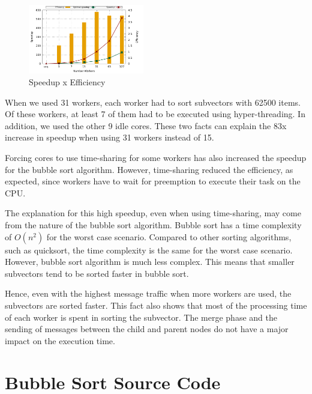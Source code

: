 \documentclass[10pt,twocolumn]{article}
\begin{document}
\begin{figure}[ht]
	\centering
	\includegraphics[width=0.45\textwidth]{../logs/scripts/bubble-sort-speedup-efficiency.pdf}
	\caption{Speedup x Efficiency}
	\label{fig:bubble-sort-speedup-efficiency}
\end{figure}

When we used 31 workers, each worker had to sort subvectors with 62500 items. Of these workers, at least 7 of them had to be executed using hyper-threading. In addition, we used the other 9 idle cores. These two facts can explain the 83x increase in speedup when using 31 workers instead of 15.

Forcing cores to use time-sharing for some workers has also increased the speedup for the bubble sort algorithm. However, time-sharing reduced the efficiency, as expected, since workers have to wait for preemption to execute their task on the CPU.

The explanation for this high speedup, even when using time-sharing, may come from the nature of the bubble sort algorithm. Bubble sort has a time complexity of $O(n^2)$ for the worst case scenario. Compared to other sorting algorithms, such as quicksort, the time complexity is the same for the worst case scenario. However, bubble sort algorithm is much less complex. This means that smaller subvectors tend to be sorted faster in bubble sort.

Hence, even with the highest message traffic when more workers are used, the subvectors are sorted faster. This fact also shows that most of the processing time of each worker is spent in sorting the subvector. The merge phase and the sending of messages between the child and parent nodes do not have a major impact on the execution time.

\onecolumn

\section*{Bubble Sort Source Code}



\end{document}
